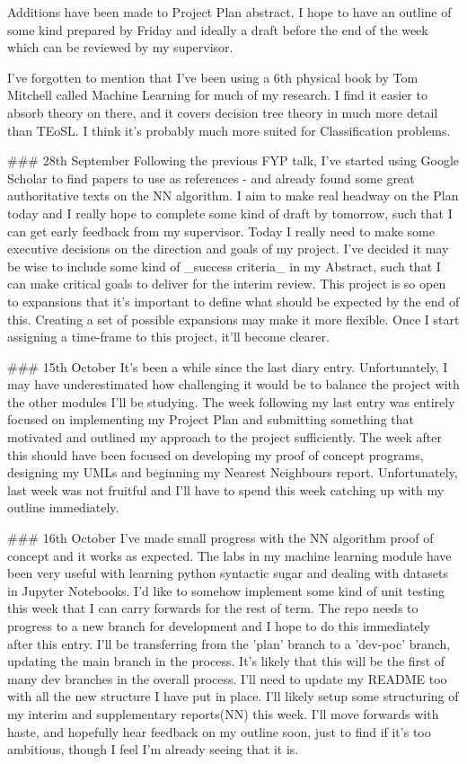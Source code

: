 \documentclass[letterpaper,10pt]{article}
\begin{document}
\begin{markdown}
Additions have been made to Project Plan abstract. I hope to have an outline of some kind prepared by Friday and ideally a draft before the end of the week which can be reviewed by my supervisor.

I've forgotten to mention that I've been using a 6th physical book by Tom Mitchell called Machine Learning for much of my research. I find it easier to absorb theory on there, and it covers decision tree theory in much more detail than TEoSL. I think it's probably much more suited for Classification problems.

### 28th September
Following the previous FYP talk, I've started using Google Scholar to find papers to use as references - and already found some great authoritative texts on the NN algorithm.  
I aim to make real headway on the Plan today and I really hope to complete some kind of draft by tomorrow, such that I can get early feedback from my supervisor. Today I really need to make some executive decisions on the direction and goals of my project.  
I've decided it may be wise to include some kind of _success criteria_ in my Abstract, such that I can make critical goals to deliver for the interim review. This project is so open to expansions that it's important to define what should be expected by the end of this. Creating a set of possible expansions may make it more flexible. Once I start assigning a time-frame to this project, it'll become clearer.

### 15th October
It's been a while since the last diary entry.
Unfortunately, I may have underestimated how challenging it would be to balance the project with the other modules I'll be studying.  
The week following my last entry was entirely focused on implementing my Project Plan and submitting something that motivated and outlined my approach to the project sufficiently.  
The week after this should have been focused on developing my proof of concept programs, designing my UMLs and beginning my Nearest Neighbours report. Unfortunately, last week was not fruitful and I'll have to spend this week catching up with my outline immediately.

### 16th October
I've made small progress with the NN algorithm proof of concept and it works as expected. The labs in my machine learning module have been very useful with learning python syntactic sugar and dealing with datasets in Jupyter Notebooks. I'd like to somehow implement some kind of unit testing this week that I can carry forwards for the rest of term.  
The repo needs to progress to a new branch for development and I hope to do this immediately after this entry. I'll be transferring from the 'plan' branch to a 'dev-poc' branch, updating the main branch in the process. It's likely that this will be the first of many dev branches in the overall process.  
I'll need to update my README too with all the new structure I have put in place.   
I'll likely setup some structuring of my interim and supplementary reports(NN) this week.  
I'll move forwards with haste, and hopefully hear feedback on my outline soon, just to find if it's too ambitious, though I feel I'm already seeing that it is. 


\end{markdown}
\end{document}
